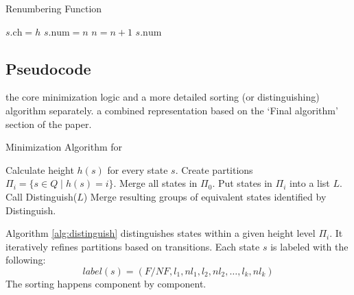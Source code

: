 \begin{algorithm}
    \caption{Renumbering Function}
    \label{alg:renumbering}
    \begin{algorithmic}[1]
                \State $s.\text{ch} = h$
                \State $s.\text{num} = n$
                \State $n = n + 1$
            \EndIf
            \State \Return $s.\text{num}$
        \EndFunction
    \end{algorithmic}
\end{algorithm}

\subsection{Pseudocode}
  the core minimization logic and a more detailed sorting (or distinguishing) algorithm separately.  a combined representation based on the `Final algorithm' section of the paper.

\begin{algorithm}
    \caption{Minimization Algorithm for }  
    \label{alg:minimization-dawg}
    \begin{algorithmic}[1]
    \State Calculate height $h(s)$ for every state $s$.
    \State Create partitions $\Pi_i = \{s \in Q \mid h(s) = i\}$.
    \State Merge all states in $\Pi_0$.
     
        \State {}
        \State Put states in $\Pi_i$ into a list $L$. 
        \State Call Distinguish($L$)
        \State Merge resulting groups of equivalent states identified by Distinguish.
    \EndFor
    \end{algorithmic}
\end{algorithm}

Algorithm \cref{alg:distinguish} distinguishes states within a given height level $\Pi_i$. It iteratively refines partitions based on transitions. Each state $s$ is labeled with the following:
$$label(s) = (F/NF, l_1, nl_1, l_2, nl_2, \dots, l_k, nl_k)$$
  The sorting happens component by component.

